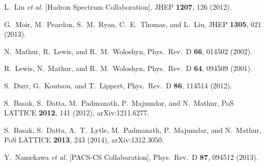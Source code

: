 \documentclass[showkeys,aps,twocolumn,showpacs,preprintnumbers,amsmath,amssymb,prd,letterpaper,floatfix,nofootinbib,superscriptaddress,]{revtex4-1}
\begin{document}
{\begin{thebibliography}{99}
  L.~Liu {\it et al.}  [Hadron Spectrum Collaboration],
  JHEP {\bf 1207}, 126 (2012).

  G.~Moir, M.~Peardon, S.~M.~Ryan, C.~E.~Thomas, and L.~Liu,
  JHEP {\bf 1305}, 021 (2013).


  N.~Mathur, R.~Lewis, and R.~M.~Woloshyn,
  Phys.\ Rev.\ D {\bf 66}, 014502 (2002).

  R.~Lewis, N.~Mathur, and R.~M.~Woloshyn,
  Phys.\ Rev.\ D {\bf 64}, 094509 (2001).

  S.~Durr,  G.~Koutsou, and T.~Lippert,
  Phys.\ Rev.\ D {\bf 86}, 114514 (2012).

  S.~Basak, S.~Datta, M.~Padmanath, P.~Majumdar, and N.~Mathur,
  PoS LATTICE {\bf 2012}, 141 (2012), arXiv:1211.6277.

  S.~Basak, S.~Datta, A.~T.~Lytle, M.~Padmanath, P.~Majumdar, and N.~Mathur,
  PoS LATTICE {\bf 2013}, 243 (2014), arXiv:1312.3050.

  Y.~Namekawa {\it et al.} [PACS-CS Collaboration],
  Phys.\ Rev.\ D {\bf 87}, 094512 (2013).


\end{thebibliography}}
\end{document}
